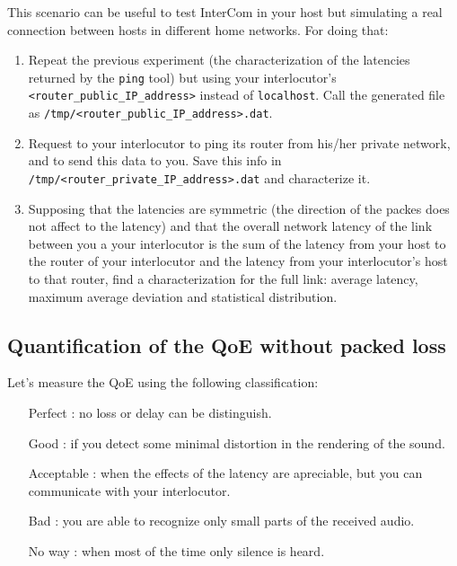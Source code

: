 This scenario can be useful to test InterCom in your host but
simulating a real connection between hosts in different home
networks. For doing that:

\begin{enumerate}
  
\item Repeat the previous experiment (the characterization of the
  latencies returned by the \texttt{ping} tool) but using your
  interlocutor's \texttt{<router\_public\_IP\_address>} instead of
  \texttt{localhost}. Call the generated file as
  \texttt{/tmp/<router\_public\_IP\_address>.dat}.
  
\item Request to your interlocutor to ping its router from his/her private
  network, and to send this data to you. Save this info in
  \texttt{/tmp/<router\_private\_IP\_address>.dat} and characterize it.

\item Supposing that the latencies are symmetric (the direction of the
  packes does not affect to the latency) and that the overall network
  latency of the link between you a your interlocutor is the sum of
  the latency from your host to the router of your interlocutor and
  the latency from your interlocutor's host to that router, find a
  characterization for the full link: average latency, maximum average
  deviation and statistical distribution.

\end{enumerate}

\subsection{Quantification of the QoE without packed loss}

Let's measure the QoE using the following classification:
\begin{itemize}
\item [Perfect]: no loss or delay can be distinguish.
\item [Good]: if you detect some minimal distortion in the rendering
  of the sound.
\item [Acceptable]: when the effects of the latency are apreciable, but
  you can communicate with your interlocutor.
\item [Bad]: you are able to recognize only small parts of the
  received audio.
\item [No way]: when most of the time only silence is heard.
\end{itemize}

